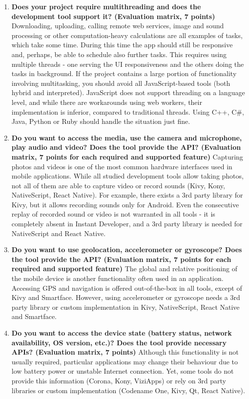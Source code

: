 \documentclass[english,master,public,dept460,male,cpdeclaration,oneside]{diploma}
\begin{document}
\begin{enumerate}
	\item \textbf{Does your project require multithreading and does the development tool support it? (Evaluation matrix, 7 points) }
	Downloading, uploading, calling remote web services, image and sound processing or other computation-heavy calculations are all examples of tasks, which take some time. During this time the app should still be responsive and, perhaps, be able to schedule also further tasks. This requires using multiple threads - one serving the UI responsiveness and the others doing the tasks in background. If the project contains a large portion of functionality involving multitasking, you should avoid all JavaScript-based tools (both hybrid and interpreted). JavaScript does not support threading on a language level, and while there are workarounds using web workers, their implementation is inferior, compared to traditional threads. Using C++, C\#, Java, Python or Ruby should handle the situation just fine.
	
	\item \textbf{Do you want to access the media, use the camera and microphone, play audio and video? Does the tool provide the API? (Evaluation matrix, 7 points for each required and supported feature) }
	Capturing photos and videos is one of the most common hardware interfaces used in mobile applications. While all studied development tools allow taking photos, not all of them are able to capture video or record sounds (Kivy, Kony, NativeScript, React Native). For example, there exists a 3rd party library for Kivy, but it allows recording sounds only for Android. Even the consecutive replay of recorded sound or video is not warranted in all tools - it is completely absent in Instant Developer, and a 3rd party library is needed for NativeScript and React Native.
	
	\item \textbf{Do you want to use geolocation, accelerometer or gyroscope? Does the tool provide the API? (Evaluation matrix, 7 points for each required and supported feature) }
	The global and relative positioning of the mobile device is another functionality often used in an application. Accessing GPS and navigation is offered out-of-the-box in all tools, except of Kivy and Smartface. However, using accelerometer or gyroscope needs a 3rd party library or custom implementation in Kivy, NativeScript, React Native and Smartface.
	
	\item \textbf{Do you want to access the device state (battery status, network availability, OS version, etc.)? Does the tool provide necessary APIs? (Evaluation matrix, 7 points) }
	Although this functionality is not usually required, particular applications may change their behaviour due to low battery power or unstable Internet connection. Yet, some tools do not provide this information (Corona, Kony, ViziApps) or rely on 3rd party libraries or custom implementation (Codename One, Kivy, Qt, React Native).
	

\end{enumerate}
\end{document}
